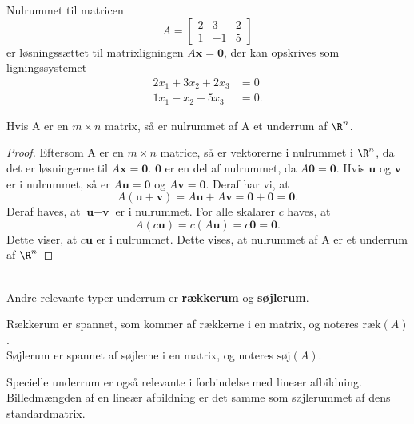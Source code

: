 \begin{eks}\label{nulrum}
Nulrummet til matricen
$$A=\begin{bmatrix}
2 & 3 & 2\\
1 & -1 & 5
\end{bmatrix}$$
er løsningssættet til matrixligningen $A\textbf{x}=\textbf{0}$,
der kan opskrives som ligningssystemet
\begin{align*}
2x_1+3x_2+2x_3&=0\\
1x_1-x_2+5x_3&=0.
\end{align*}
\end{eks} 
\begin{thm}{}{}
Hvis A er en $m\times n$ matrix, så er nulrummet af A et underrum af $\R^n$.
\end{thm}
\begin{proof}
Eftersom A er en $m\times n$ matrice, så er vektorerne i nulrummet i $\R^n$, da det er løsningerne til $A\textbf{x}=\textbf{0}$. $\textbf{0}$ er en del af nulrummet, da $A\textbf{0}=\textbf{0}$. Hvis $\textbf{u}$ og $\textbf{v}$ er i nulrummet, så er $A\textbf{u}=\textbf{0}$ og $A\textbf{v}=\textbf{0}$. Deraf har vi, at
$$A(\textbf{u}+\textbf{v})=A\textbf{u}+A\textbf{v}=\textbf{0}+\textbf{0}=\textbf{0}.$$
Deraf haves, at $\textbf{u}+\textbf{v}$ er i nulrummet. For alle skalarer $c$ haves, at
$$A(c\textbf{u})=c(A\textbf{u})=c\textbf{0}=\textbf{0}.$$
Dette viser, at $c\textbf{u}$ er i nulrummet.
Dette vises, at nulrummet af A er et underrum af $\R^n$
\end{proof}\\
\noindent
Andre relevante typer underrum er \textbf{rækkerum} og \textbf{søjlerum}.
\begin{defn}{}{}
Rækkerum er spannet, som kommer af rækkerne i en matrix, og noteres $\text{ræk}(A)$.\\
Søjlerum er spannet af søjlerne i en matrix, og noteres $\text{søj}(A)$.
\end{defn}
\noindent
Specielle underrum er også relevante i forbindelse med lineær afbildning.
Billedmængden af en lineær afbildning er det samme som søjlerummet af dens standardmatrix.

